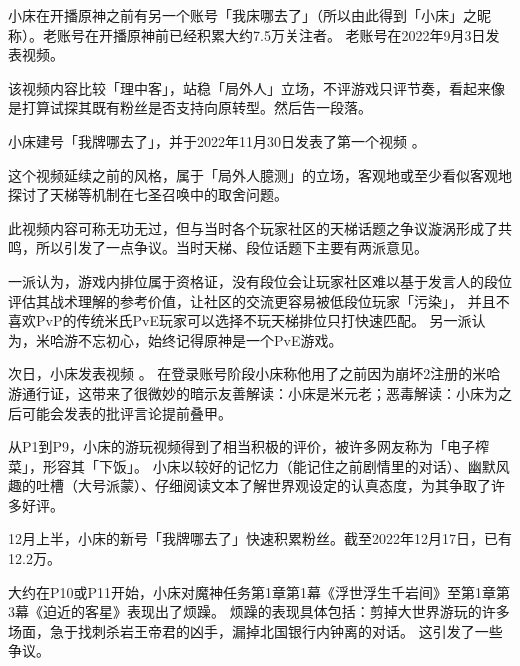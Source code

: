\begin{multicols*}{2}


	小床在开播原神之前有另一个账号「我床哪去了」（所以由此得到「小床」之昵称）。老账号在开播原神前已经积累大约7.5万关注者。
	老账号在2022年9月3日发表视频\href{https://www.bilibili.com/video/BV12e4y1Y71p}{}。

	该视频内容比较「理中客」，站稳「局外人」立场，不评游戏只评节奏，看起来像是打算试探其既有粉丝是否支持向原转型。然后告一段落。

	小床建号「我牌哪去了」，并于2022年11月30日发表了第一个视频%
	\href{https://www.bilibili.com/video/BV1XG411M7Nh}{}。

	这个视频延续之前的风格，属于「局外人臆测」的立场，客观地或至少看似客观地探讨了天梯等机制在七圣召唤中的取舍问题。

	此视频内容可称无功无过，但与当时各个玩家社区的天梯话题之争议漩涡形成了共鸣，所以引发了一点争议。当时天梯、段位话题下主要有两派意见。

	一派认为，游戏内排位属于资格证，没有段位会让玩家社区难以基于发言人的段位评估其战术理解的参考价值，让社区的交流更容易被低段位玩家「污染」，
	并且不喜欢PvP的传统米氏PvE玩家可以选择不玩天梯排位只打快速匹配。
	另一派认为，米哈游不忘初心，始终记得原神是一个PvE游戏。

	次日，小床发表视频%
	\href{https://www.bilibili.com/video/BV1zG4y197cG}{}。
	在登录账号阶段小床称他用了之前因为崩坏2注册的米哈游通行证，这带来了很微妙的暗示\pozhehao{}友善解读：小床是米元老；恶毒解读：小床为之后可能会发表的批评言论提前叠甲。

	从P1到P9，小床的游玩视频得到了相当积极的评价，被许多网友称为「电子榨菜」，形容其「下饭」。
	小床以较好的记忆力（能记住之前剧情里的对话）、幽默风趣的吐槽（大号派蒙）、仔细阅读文本了解世界观设定的认真态度，为其争取了许多好评。

	12月上半，小床的新号「我牌哪去了」快速积累粉丝。截至2022年12月17日，已有12.2万。


	大约在P10或P11开始，小床对魔神任务第1章第1幕《浮世浮生千岩间》至第1章第3幕《迫近的客星》表现出了烦躁。
	烦躁的表现具体包括：剪掉大世界游玩的许多场面，急于找刺杀岩王帝君的凶手，漏掉北国银行内钟离的对话。
	这引发了一些争议。


\end{multicols*}
